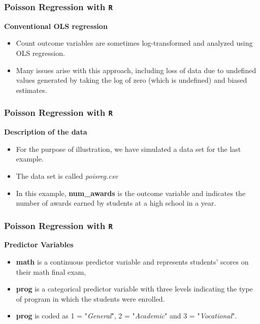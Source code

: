 \documentclass[MASTER.tex]{subfiles}
\begin{document}
\begin{frame}[fragile]
	
	\frametitle{Poisson Regression with \texttt{R}}
	\Large
	\textbf{Conventional OLS regression}
	\begin{itemize}
		\item Count outcome variables are sometimes log-transformed and analyzed using OLS regression. 
		\item Many issues arise with this approach, including loss of data due to undefined values generated by taking the log of zero (which is undefined) and biased estimates.
	\end{itemize}

\end{frame}


\begin{frame}[fragile]

\frametitle{Poisson Regression with \texttt{R}}
\Large
\textbf{Description of the data}

\begin{itemize}
\item For the purpose of illustration, we have simulated a data set for the last example.

\item The data set is called \textit{poisreg.csv}  

\item In this example, \textbf{num\_awards} is the outcome variable and indicates the number of awards earned by students at a high school in a year.

\end{itemize}
\end{frame}
\begin{frame}[fragile]
	
	\frametitle{Poisson Regression with \texttt{R}}
	\Large
	\textbf{Predictor Variables}
\begin{itemize}
\item \textbf{math} is a continuous predictor variable and represents students' scores on their math final exam, \item \textbf{prog} is a categorical predictor variable with three levels indicating the type of program in which the students were enrolled.

\item  \textbf{prog} is coded as 1 = "\textit{General}",
 2 = "\textit{Academic}" and 3 = "\textit{Vocational}". 
\end{itemize}

\end{frame}
\end{document}
